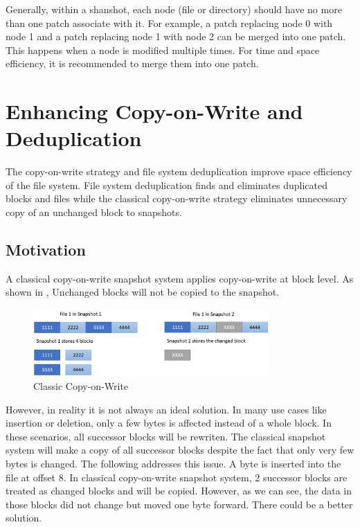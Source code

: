 	Generally, within a shanshot, each node (file or directory) should have no more than one patch associate with it. For example, a patch replacing node 0 with node 1 and a patch replacing node 1 with  node 2 can be merged into one patch. This happens when a node is modified multiple times. For time and space efficiency, it is recommended to merge them into one patch.
	
\section{Enhancing Copy-on-Write and Deduplication}

	The copy-on-write strategy and file system deduplication improve space efficiency of the file system. File system deduplication finds and eliminates duplicated blocks and files while the classical copy-on-write strategy eliminates unnecessary copy of an unchanged block to snapshots.

\subsection{Motivation}

    A classical copy-on-write snapshot system applies copy-on-write at block level. As shown in , Unchanged blocks will not be copied to the snapshot.

\begin{figure}[hbtp]
\centering
\includegraphics[width=0.8\textwidth]{Chapter-4/figs/fig4.png}
\caption{Classic Copy-on-Write}
\label{fig:classic_cow}
\end{figure}

    However, in reality it is not always an ideal solution. In many use cases like insertion or deletion, only a few bytes is affected instead of a whole block. In these scenarios, all successor blocks will be rewriten. The classical snapshot system will make a copy of all successor blocks despite the fact that only very few bytes is changed. The following  addresses this issue. A byte is inserted into the file at offset 8. In classical copy-on-write snapshot system, 2 successor blocks are treated as changed blocks and will be copied. However, as we can see, the data in those blocks did not change but moved one byte forward. There could be a better solution.

